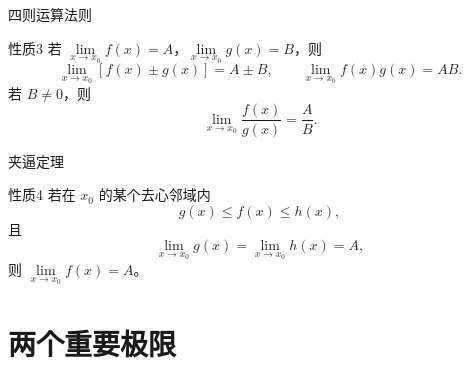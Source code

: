 \documentclass[aspectratio=169,10pt]{ctexbeamer}
\begin{document}
\begin{frame}{四则运算法则}
	\normalsize
	\begin{block}{性质3}
		若 \(\lim\limits_{x\to x_0}f(x)=A\)，\(\lim\limits_{x\to x_0}g(x)=B\)，则
		\[
		\lim\limits_{x\to x_0}[f(x)\pm g(x)]=A\pm B,\qquad
		\lim\limits_{x\to x_0}f(x)g(x)=AB.
		\]
		若 \(B\neq0\)，则
		\[
		\lim\limits_{x\to x_0}\frac{f(x)}{g(x)}=\frac AB.
		\]
	\end{block}
\end{frame}

\begin{frame}{夹逼定理}
	\normalsize
	\begin{block}{性质4}
		若在 \(x_0\) 的某个去心邻域内
		\[
		g(x)\leq f(x)\leq h(x),
		\]
		且
		\[
		\lim\limits_{x\to x_0}g(x)=\lim\limits_{x\to x_0}h(x)=A,
		\]
		则 \(\lim\limits_{x\to x_0}f(x)=A\)。
	\end{block}
\end{frame}

\section{两个重要极限}
\end{document}

